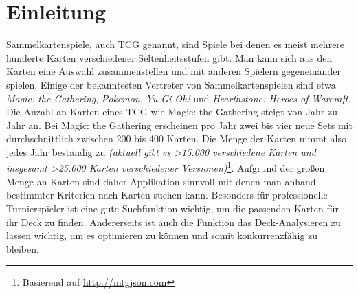 \chapter{Einleitung}\label{ch:intro}
%
%

Sammelkartenspiele, auch \ac{TCG} genannt, sind Spiele bei denen es meist mehrere hunderte Karten verschiedener Seltenheitsstufen gibt. Man kann sich aus den Karten eine Auswahl zusammenstellen und mit anderen Spielern gegeneinander spielen. Einige der bekanntesten Vertreter von Sammelkartenspielen sind etwa \emph{Magic: the Gathering}, \emph{Pokemon}, \emph{Yu-Gi-Oh!} und \emph{Hearthstone: Heroes of Warcraft}. Die Anzahl an Karten eines \ac{TCG} wie Magic: the Gathering steigt von Jahr zu Jahr an. Bei Magic: the Gathering erscheinen pro Jahr zwei bis vier neue Sets mit durchschnittlich zwischen 200 bis 400 Karten. Die Menge der Karten nimmt also jedes Jahr beständig zu \emph{(aktuell gibt es >15.000 verschiedene Karten und insgesamt >25.000 Karten verschiedener Versionen)}\footnote{Basierend auf \url{http://mtgjson.com}}. Aufgrund der großen Menge an Karten sind daher Applikation sinnvoll mit denen man anhand bestimmter Kriterien nach Karten suchen kann. Besonders für professionelle Turnierspieler ist eine gute Suchfunktion wichtig, um die passenden Karten für ihr Deck zu finden. Andererseits ist auch die Funktion das Deck-Analysieren zu lassen wichtig, um es optimieren zu können und somit konkurrenzfähig zu bleiben.

